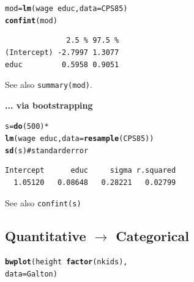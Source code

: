 \documentclass{report}\usepackage{graphicx, color}
\makeatletter
\newcommand{\hlfunctioncall}[1]{\textcolor[rgb]{0.501960784313725,0,0.329411764705882}{\textbf{#1}}}%
\newcommand{\hlcomment}[1]{\textcolor[rgb]{0.180392156862745,0.6,0.341176470588235}{#1}}%
\newenvironment{kframe}{%
 \def\at@end@of@kframe{}%
 \ifinner\ifhmode%
  \def\at@end@of@kframe{\end{minipage}}%
  \begin{minipage}{\columnwidth}%
 \fi\fi%
 \def\FrameCommand##1{\hskip\@totalleftmargin \hskip-\fboxsep
 \colorbox{shadecolor}{##1}\hskip-\fboxsep
     \hskip-\linewidth \hskip-\@totalleftmargin \hskip\columnwidth}%
 \MakeFramed {\advance\hsize-\width
   \@totalleftmargin\z@ \linewidth\hsize
   \@setminipage}}%
 {\par\unskip\endMakeFramed%
 \at@end@of@kframe}
\newenvironment{knitrout}{}{} %
\makeatother
\begin{document}
\begin{multicols}{4}
\vspace*{-.1in}

\begin{knitrout}
\color{fgcolor}\begin{kframe}
\begin{alltt}
mod = \hlfunctioncall{lm}( wage ~ educ, data=CPS85 )
\hlfunctioncall{confint}(mod)
\end{alltt}
\begin{verbatim}
              2.5 % 97.5 %
(Intercept) -2.7997 1.3077
educ         0.5958 0.9051
\end{verbatim}
\end{kframe}
\end{knitrout}

See also \texttt{summary(mod)}.

\bigskip

 {\bf ... via bootstrapping}

\vspace*{-.1in}

\begin{knitrout}
\color{fgcolor}\begin{kframe}
\begin{alltt}
s = \hlfunctioncall{do}(500)*
  \hlfunctioncall{lm}(wage~educ, data=\hlfunctioncall{resample}(CPS85))
\hlfunctioncall{sd}(s) \hlcomment{# standard error}
\end{alltt}
\begin{verbatim}
Intercept      educ     sigma r.squared 
  1.05120   0.08648   0.28221   0.02799 
\end{verbatim}
\end{kframe}
\end{knitrout}

See also \texttt{confint(s)}
\vill
\columnbreak

\subsection*{Quantitative $\rightarrow$ Categorical}
\begin{knitrout}
\color{fgcolor}\begin{kframe}
\begin{alltt}
\hlfunctioncall{bwplot}( height ~ \hlfunctioncall{factor}(nkids), 
        data=Galton )
\end{alltt}
\end{kframe}


\end{knitrout}
\end{multicols}
\end{document}
